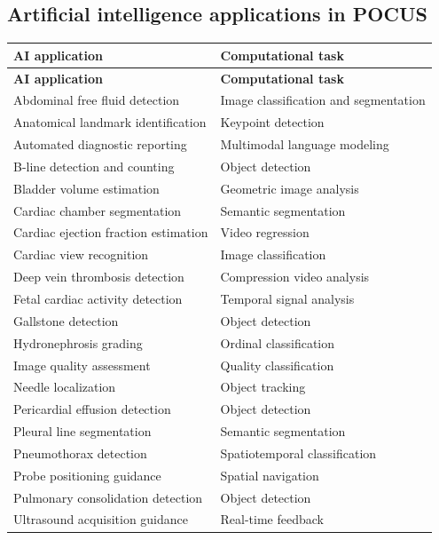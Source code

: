 \subsection{Artificial intelligence applications in POCUS}
\begin{longtable}{@{}p{}p{}@{}}
\toprule
\textbf{AI application} & \textbf{Computational task} \\
\midrule
\endfirsthead
\toprule
\textbf{AI application} & \textbf{Computational task} \\
\midrule
\endhead
Abdominal free fluid detection & Image classification and segmentation \\
Anatomical landmark identification & Keypoint detection \\
Automated diagnostic reporting & Multimodal language modeling \\
B-line detection and counting & Object detection \\
Bladder volume estimation & Geometric image analysis \\
Cardiac chamber segmentation & Semantic segmentation \\
Cardiac ejection fraction estimation & Video regression \\
Cardiac view recognition & Image classification \\
Deep vein thrombosis detection & Compression video analysis \\
Fetal cardiac activity detection & Temporal signal analysis \\
Gallstone detection & Object detection \\
Hydronephrosis grading & Ordinal classification \\
Image quality assessment & Quality classification \\
Needle localization & Object tracking \\
Pericardial effusion detection & Object detection \\
Pleural line segmentation & Semantic segmentation \\
Pneumothorax detection & Spatiotemporal classification \\
Probe positioning guidance & Spatial navigation \\
Pulmonary consolidation detection & Object detection \\
Ultrasound acquisition guidance & Real-time feedback \\
\bottomrule
\end{longtable}

